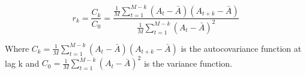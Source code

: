 \begin{enumerate}
    \begin{equation} \label{eq: autocorrelation}
      r_k = \frac{C_k}{C_0} = \frac{\frac{1}{M} \sum_{t = 1}^{M - k}{(A_t - \bar{A})(A_{t+k} - \bar{A})}}{\frac{1}{M} \sum_{t = 1}^{M - k}{(A_t - \bar{A})^2}}
    \end{equation}

    Where $C_k = \frac{1}{M} \sum_{t = 1}^{M - k}{(A_t - \bar{A})(A_{t+k} - \bar{A})}$ is the autocovariance function at lag k and $C_0 = \frac{1}{M} \sum_{t = 1}^{M - k}{(A_t - \bar{A})^2}$ is the variance function.
    
\end{enumerate}

